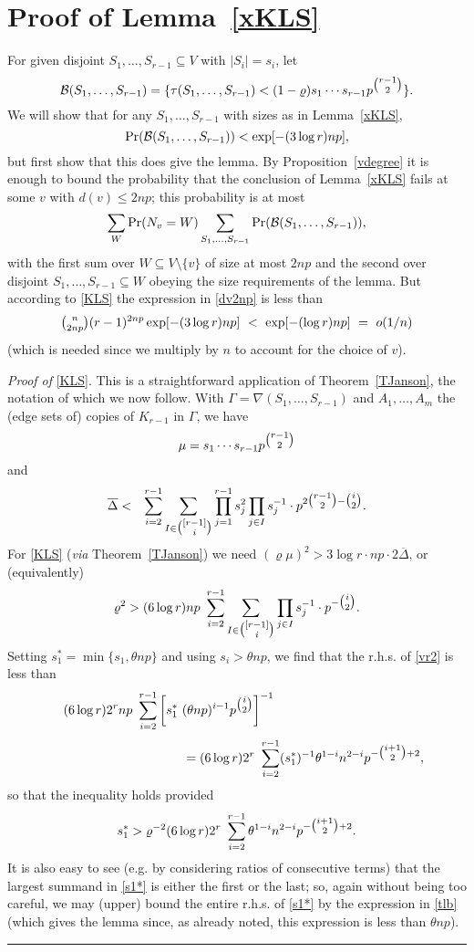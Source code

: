 \documentclass[letterpaper,11pt]{article}
\newcommand{\beq}[1]{\begin{equation}\label{#1}}
\newcommand{\enq}[0]{\end{equation}}
\newcommand{\mn}[0]{\medskip\noindent}
\newcommand{\sub}[0]{\subseteq}
\newcommand{\sm}[0]{\setminus}
\renewcommand{\dots}[0]{,\ldots,}
\newcommand{\ov}[0]{\overline}
\newcommand{\B}[0]{{\cal B}}
\newcommand{\0}[0]{\emptyset}
\renewcommand{\qed}[0]{\begin{flushright} \rule{2mm}{3mm} \end{flushright}}
\newcommand{\Cc}[0]{\tbinom}
\newcommand{\gD}[0]{\Delta }
\newcommand{\gG}[0]{\Gamma }
\newcommand{\gL}[0]{\Lambda}
\newcommand{\vr}[0]{\varrho}
\newcommand{\glr}[0]{\gL_r(n,p)}
\begin{document}
\section{Proof of Lemma~\ref{xKLS}}\label{PLxKLS}





\mn
For given disjoint $ S_1\dots S_{r-1}\sub V$
with $|S_i|=s_i$, let
\[
\B(S_1\dots S_{r-1})
= \{\tau(S_1\dots S_{r-1})
< (1-\vr)s_1\cdots s_{r-1} p^{\Cc{r-1}{2}}\}.
\]
We will show that for any $ S_1\dots S_{r-1}$ with sizes as in
Lemma~\ref{xKLS},
\beq{KLS}
\Pr(\B(S_1\dots S_{r-1})) < \exp[-(3 \log r)np],
\enq
but first show that this does give the lemma.
By Proposition~\ref{vdegree} it is enough to bound the probability that
the conclusion of Lemma~\ref{xKLS} fails at some $v$ with $d(v)\leq 2np$;
this probability is at most
\beq{dv2np}
\sum_W\Pr(N_v=W)
\sum_{S_1\dots S_{r-1}}\Pr(\B(S_1\dots S_{r-1})),
\enq
with the first
sum over $W\sub V\sm \{v\}$ of size at most $2np$
and the second over disjoint $S_1\dots S_{r-1}\sub W$ obeying
the size requirements of the lemma.
But according to
\eqref{KLS} the expression in \eqref{dv2np} is less than
\[
\Cc{n}{2np}(r-1)^{2np} \exp[-(3 \log r)np] ~ <~ \exp[-(\log r)np] ~=~ o(1/n)
\]
(which is needed since we multiply by $n$ to account for
the choice of $v$).

\mn
{\em Proof of} \eqref{KLS}.
This is a straightforward application of Theorem~\ref{TJanson}, the
notation of which we now follow.
%
With $\gG=\nabla(S_1\dots S_{r-1})$ and
$A_1\dots A_m$ the (edge sets of) copies of $K_{r-1}$ in $\gG$,
we have
%
\beq{mubd}
\mu = s_1\cdots s_{r-1} p^{\Cc{r-1}{2}}
\enq
and
\begin{eqnarray}
\ov{\gD} &<& \sum_{i=2}^{r-1}\sum_{I\in \Cc{[r-1]}{i}}
\prod_{j=1}^{r-1}s_j^2\prod_{j\in I}s_j^{-1}
\cdot p^{2\Cc{r-1}{2}-\Cc{i}{2}}.\nonumber
\end{eqnarray}
%
For \eqref{KLS} ({\em via} Theorem~\ref{TJanson}) we need
$(\vr \mu)^2 > 3\log r\cdot np\cdot 2\ov{\gD}$, or
(equivalently)
\beq{vr2}
\vr^2 > (6\log r) np ~
\sum_{i=2}^{r-1}
\sum_{I\in \Cc{[r-1]}{i}}
\prod_{j\in I}s_j^{-1}
\cdot p^{-\Cc{i}{2}}.
\enq
Setting $s_1^*=\min\{s_1,\theta np\}$ and using $s_i>\theta np$, we find that
the r.h.s. of \eqref{vr2} is less than
\[
(6\log r) 2^r np ~
\sum_{i=2}^{r-1}
\left[ s_1^* ~(\theta np)^{i-1}
p^{\Cc{i}{2}}\right]^{-1}
 ~~~~~~~~~~~~~~~~~~~~~~~~~~~~~~~~
\]
\[
 ~~~~~~~~~~~~~~~~~~~~~~~~~~~~~~~~
 = (6\log r) 2^r  ~
\sum_{i=2}^{r-1}
 (s_1^*)^{-1}\theta ^{1-i} n^{2-i}p^{-\Cc{i+1}{2}+2},
\]
so that the inequality holds provided
\beq{s1*}
s_1^*  > \vr^{-2}
(6\log r) 2^r  ~
\sum_{i=2}^{r-1}
\theta ^{1-i} n^{2-i}p^{-\Cc{i+1}{2}+2}.
\enq
It is also easy to see (e.g. by considering ratios
of consecutive terms) that the largest summand
in \eqref{s1*} is either the first or the last; so,
again without being too careful,
we may (upper) bound the entire
r.h.s. of \eqref{s1*} by the expression in \eqref{tlb}
(which gives the lemma since, as already noted, this expression
is less than $\theta np$).\qed
\end{document}
